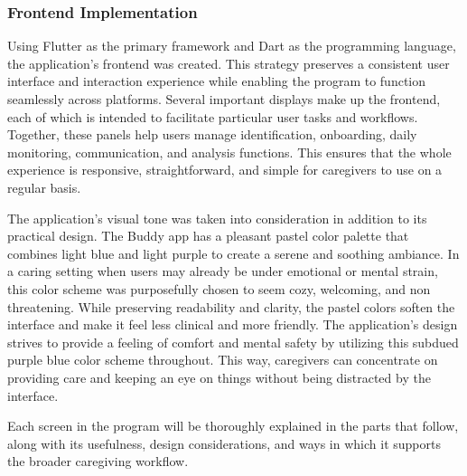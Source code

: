 \subsubsection{Frontend Implementation}
{ 
	\setlength{\leftskip}{1.8cm}
	\setlength{\parindent}{5em}
	Using Flutter as the primary framework and Dart as the programming language, the application's frontend was created. This strategy preserves a consistent user interface and interaction experience while enabling the program to function seamlessly across platforms. Several important displays make up the frontend, each of which is intended to facilitate particular user tasks and workflows. Together, these panels help users manage identification, onboarding, daily monitoring, communication, and analysis functions. This ensures that the whole experience is responsive, straightforward, and simple for caregivers to use on a regular basis.
	\par
}

{ 
	\setlength{\leftskip}{1.8cm}
	\setlength{\parindent}{5em}
	The application's visual tone was taken into consideration in addition to its practical design. The Buddy app has a pleasant pastel color palette that combines light blue and light purple to create a serene and soothing ambiance. In a caring setting when users may already be under emotional or mental strain, this color scheme was purposefully chosen to seem cozy, welcoming, and non threatening. While preserving readability and clarity, the pastel colors soften the interface and make it feel less clinical and more friendly. The application's design strives to provide a feeling of comfort and mental safety by utilizing this subdued purple blue color scheme throughout. This way, caregivers can concentrate on providing care and keeping an eye on things without being distracted by the interface.
	\par
}

{ 
	\setlength{\leftskip}{1.8cm}
	\setlength{\parindent}{5em}
	Each screen in the program will be thoroughly explained in the parts that follow, along with its usefulness, design considerations, and ways in which it supports the broader caregiving workflow.
	\par
}

